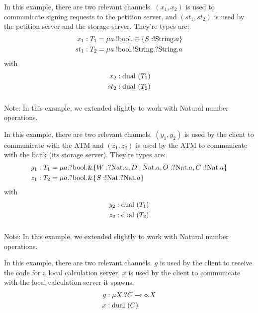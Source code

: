 In this example, there are two relevant channels. $(x_1, x_2)$ is used to communicate signing requests to the petition server, and $(st_1, st_2)$ is used by the petition server and the storage server.
They're types are:
\begin{align*}
x_1 &: T_1 = \mu a . ! \text{bool} . \oplus \{S : ! \text{String} . a \}\\
st_1 &: T_2 = \mu a . ! \text{bool} . ! \text{String} . ? \text{String} . a
\end{align*}
with
\begin{align*}
x_2 &: \text{dual }(T_1)\\
st_2 &: \text{dual }(T_2)
\end{align*}

\subsubsection{}
Note: In this example, we extended  slightly to work with Natural number operations.

In this example, there are two relevant channels. $(y_1, y_2)$ is used by the client to communicate with the ATM and $(z_1, z_2)$ is used by the ATM to communicate with the bank (its storage server).
They're types are:
\begin{align*}
y_1 &: T_1 = \mu a . ? \text{bool} . \&\{W : ? \text{Nat} . a  , D : \text{Nat} . a , O : ? \text{Nat} . a, C : ! \text{Nat} . a\}\\
z_1 &: T_2 = \mu a . ? \text{bool} . \&\{S : ! \text{Nat} . ? \text{Nat} . a\}
\end{align*}
with
\begin{align*}
y_2 &: \text{dual }(T_1)\\
z_2 &: \text{dual }(T_2)
\end{align*}

\subsubsection{}
Note: In this example, we extended  slightly to work with Natural number operations.

In this example, there are two relevant channels. $g$ is used by the client to receive the code for a local calculation server, $x$ is used by the client to communicate with the local calculation server it spawns.
\begin{align*}
g &: \mu X . ? C \multimap \diamond . X\\
x &: \text{dual }(C)\\
\end{align*}

